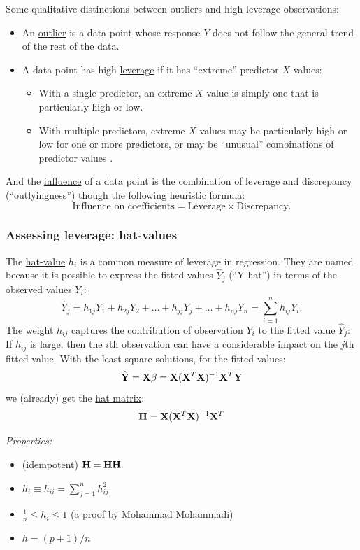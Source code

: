 Some qualitative distinctions between outliers and high leverage observations:
\begin{itemize}
  \item An \underline{outlier} is a data point whose response $Y$ does not follow the general trend of the rest of the data.
  \item A data point has high \underline{leverage} if it has ``extreme'' predictor $X$ values:
    \begin{itemize}
      \item With a single predictor, an extreme $X$ value is simply one that is particularly high or low.
      \item With multiple predictors, extreme $X$ values may be particularly high or low for one or more predictors, or may be ``unusual'' combinations of predictor values .
    \end{itemize}
\end{itemize}
And the \underline{influence} of a data point is the combination of leverage and discrepancy (``outlyingness'') though the following heuristic formula:
$$
\mbox{Influence on coefficients} = \mbox{Leverage} \times \mbox{Discrepancy}.
$$

\subsubsection*{Assessing leverage: hat-values}
The \underline{hat-value} $h_i$ is a common measure of leverage in regression.
They are named because it is possible to express the fitted values $\hat{Y}_j$ (``Y-hat'') in terms of the observed values $Y_i$:
$$
\hat{Y}_j = h_{1j} Y_1 + h_{2j} Y_2 + \dots + h_{jj} Y_j + \dots + h_{nj} Y_n = \sum\limits_{i = 1}^n h_{ij} Y_i.
$$
The weight $h_{ij}$ captures the contribution of observation $Y_i$ to the fitted value $\hat{Y}_j$: If $h_{ij}$ is large, then the $i$th observation can have a considerable impact on the $j$th fitted value.
With the least square solutions, for the fitted values:
$$
\hat{\mathbf{Y}} = \mathbf{X\beta} = \mathbf{X} (\mathbf{X}^T \mathbf{X})^{-1} \mathbf{X}^T \mathbf{Y}
$$
we (already) get the \underline{hat matrix}:
$$
\mathbf{H} = \mathbf{X} (\mathbf{X}^T \mathbf{X})^{-1} \mathbf{X}^T
$$

{\it Properties:}
\begin{itemize}
  \item (idempotent) $\mathbf{H} = \mathbf{HH}$
  \item $h_i \equiv h_{ii} = \sum_{j = 1}^n h_{ij}^2$
  \item $\frac{1}{n} \le h_{i} \le 1$    (\href{https://www.ine.pt/revstat/pdf/rs160104.pdf}{a proof} by Mohammad Mohammadi)
  \item $\bar{h} = (p + 1) / n$
\end{itemize}

